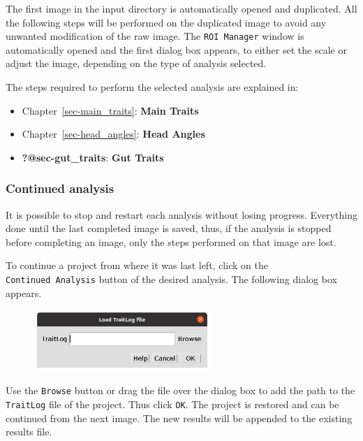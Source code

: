 \documentclass[
  letterpaper,
  DIV=11,
  numbers=noendperiod,
  oneside]{scrreprt}
\providecommand{\tightlist}{%
  \setlength{\itemsep}{0pt}\setlength{\parskip}{0pt}}\usepackage{longtable,booktabs,array}
\begin{document}
The first image in the input directory is automatically opened and
duplicated. All the following steps will be performed on the duplicated
image to avoid any unwanted modification of the raw image. The
\texttt{ROI\ Manager} window is automatically opened and the first
dialog box appears, to either set the scale or adjust the image,
depending on the type of analysis selected.

The steps required to perform the selected analysis are explained in:

\begin{itemize}
\tightlist
\item
  Chapter~\ref{sec-main_traits}: \textbf{Main Traits}
\item
  Chapter~\ref{sec-head_angles}: \textbf{Head Angles}
\item
  \textbf{?@sec-gut\_traits}: \textbf{Gut Traits}
\end{itemize}

\hypertarget{continued-analysis}{%
\subsubsection*{Continued analysis}\label{continued-analysis}}

It is possible to stop and restart each analysis without losing
progress. Everything done until the last completed image is saved, thus,
if the analysis is stopped before completing an image, only the steps
performed on that image are lost.

To continue a project from where it was last left, click on the
\texttt{Continued\ Analysis} button of the desired analysis. The
following dialog box appears.

\begin{figure}

{\centering \includegraphics[width=0.6\textwidth,height=\textheight]{./images/screenshots/load_traitlog.png}

}

\end{figure}

Use the \texttt{Browse} button or drag the file over the dialog box to
add the path to the \texttt{TraitLog} file of the project. Thus click
\texttt{OK}. The project is restored and can be continued from the next
image. The new results will be appended to the existing results file.
\end{document}
